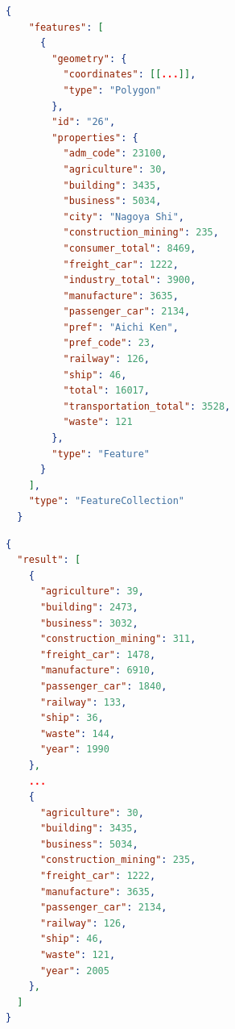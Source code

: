 \begin{lstlisting}[language=json,firstnumber=1, basicstyle=\small, caption={A response from GET /overall\_ems/municipality },captionpos=t]
  {
    "features": [
      {
        "geometry": {
          "coordinates": [[...]],
          "type": "Polygon"
        },
        "id": "26",
        "properties": {
          "adm_code": 23100,
          "agriculture": 30,
          "building": 3435,
          "business": 5034,
          "city": "Nagoya Shi",
          "construction_mining": 235,
          "consumer_total": 8469,
          "freight_car": 1222,
          "industry_total": 3900,
          "manufacture": 3635,
          "passenger_car": 2134,
          "pref": "Aichi Ken",
          "pref_code": 23,
          "railway": 126,
          "ship": 46,
          "total": 16017,
          "transportation_total": 3528,
          "waste": 121
        },
        "type": "Feature"
      }
    ],
    "type": "FeatureCollection"
  }
\end{lstlisting}
\begin{lstlisting}[language=json,firstnumber=1, basicstyle=\small, caption={A response from GET /overall\_ems/municipality\_ts},captionpos=t]
  {
  "result": [
    {
      "agriculture": 39,
      "building": 2473,
      "business": 3032,
      "construction_mining": 311,
      "freight_car": 1478,
      "manufacture": 6910,
      "passenger_car": 1840,
      "railway": 133,
      "ship": 36,
      "waste": 144,
      "year": 1990
    },
    ...
    {
      "agriculture": 30,
      "building": 3435,
      "business": 5034,
      "construction_mining": 235,
      "freight_car": 1222,
      "manufacture": 3635,
      "passenger_car": 2134,
      "railway": 126,
      "ship": 46,
      "waste": 121,
      "year": 2005
    },
  ]
}
\end{lstlisting}

